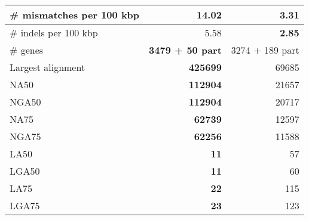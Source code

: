\documentclass[12pt,a4paper]{article}
\begin{document}
\begin{table}[ht]
\begin{center}
\begin{tabular}{|l*{2}{|r}|}
\# mismatches per 100 kbp & 14.02 & {\bf 3.31} \\ \hline
\# indels per 100 kbp & 5.58 & {\bf 2.85} \\ \hline
\# genes & {\bf 3479 + 50 part} & 3274 + 189 part \\ \hline
Largest alignment & {\bf 425699} & 69685 \\ \hline
NA50 & {\bf 112904} & 21657 \\ \hline
NGA50 & {\bf 112904} & 20717 \\ \hline
NA75 & {\bf 62739} & 12597 \\ \hline
NGA75 & {\bf 62256} & 11588 \\ \hline
LA50 & {\bf 11} & 57 \\ \hline
LGA50 & {\bf 11} & 60 \\ \hline
LA75 & {\bf 22} & 115 \\ \hline
LGA75 & {\bf 23} & 123 \\ \hline
\end{tabular}
\end{center}
\end{table}
\end{document}

